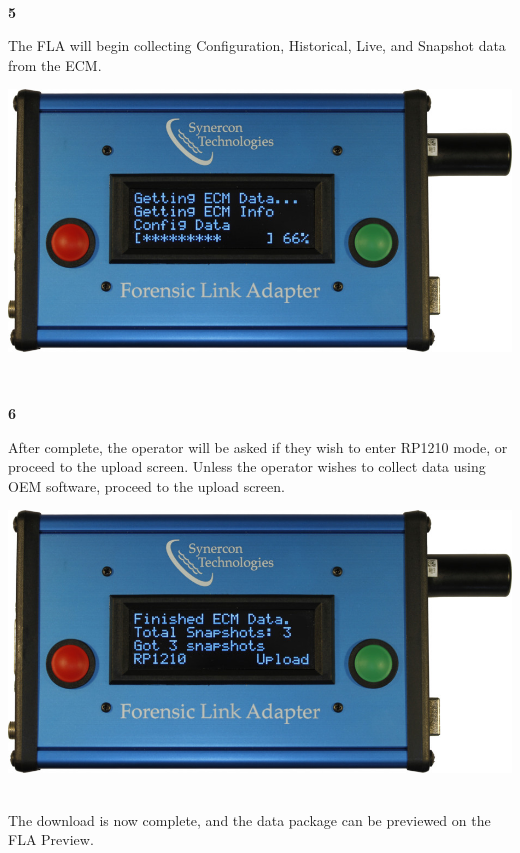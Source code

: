 \documentclass[11pt]{article}
\begin{document}
\\[\baselineskip]
\noindent\begin{minipage}{0.3\textwidth}%
\begin{center}
\textbf{5}\\[\baselineskip]
\end{center}
The FLA will begin collecting Configuration, Historical, Live, and Snapshot data from the ECM.
\end{minipage}%
\hfill%
\begin{minipage}{0.6\textwidth}
\includegraphics[width=\linewidth]{../media/fla_screens/ethernet_and_others/veh_scan/ecm_config}
\end{minipage}
\\[\baselineskip]
\noindent\begin{minipage}{0.3\textwidth}%
\begin{center}
\textbf{6}\\[\baselineskip]
\end{center}
After complete, the operator will be asked if they wish to enter RP1210 mode, or proceed to the upload screen. Unless the operator wishes to collect data using OEM software, proceed to the upload screen.
\end{minipage}%
\hfill%
\begin{minipage}{0.6\textwidth}
\includegraphics[width=\linewidth]{../media/fla_screens/ethernet_and_others/veh_scan/ecm_finished}
\end{minipage}\\[\baselineskip]
The download is now complete, and the data package can be previewed on the FLA Preview.
\end{document}
